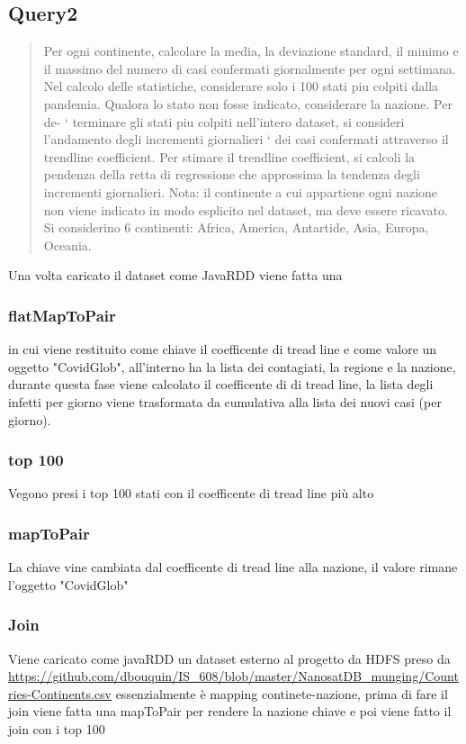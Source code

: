 \documentclass[acmsmall]{acmart}
\begin{document}
\subsection{Query2}
\begin{quote}
Per ogni continente, calcolare la media, la deviazione standard, il minimo e il massimo del numero di
casi confermati giornalmente per ogni settimana. Nel calcolo delle statistiche, considerare solo i 100
stati piu colpiti dalla pandemia. Qualora lo stato non fosse indicato, considerare la nazione. Per de- `
terminare gli stati piu colpiti nell’intero dataset, si consideri l’andamento degli incrementi giornalieri `
dei casi confermati attraverso il trendline coefficient. Per stimare il trendline coefficient, si calcoli la
pendenza della retta di regressione che approssima la tendenza degli incrementi giornalieri.
Nota: il continente a cui appartiene ogni nazione non viene indicato in modo esplicito nel dataset, ma
deve essere ricavato. Si considerino 6 continenti: Africa, America, Antartide, Asia, Europa, Oceania.\end{quote}

Una volta caricato il dataset come JavaRDD viene fatta una 
\subsubsection{flatMapToPair}
in cui viene restituito come chiave il coefficente di tread line e come valore un oggetto
"CovidGlob", all'interno ha la lista dei contagiati, la regione e la nazione, durante questa fase viene calcolato il coefficente di di tread line, la lista degli infetti per giorno viene trasformata da cumulativa alla lista dei nuovi casi (per giorno).
\subsubsection{top 100}
Vegono presi i top 100 stati con il coefficente di tread line più alto

\subsubsection{mapToPair}
La chiave vine cambiata dal coefficente di tread line alla nazione, il valore rimane l'oggetto  "CovidGlob"

\subsubsection{Join}
Viene caricato come javaRDD un dataset esterno al progetto da HDFS preso da \\ \url{https://github.com/dbouquin/IS_608/blob/master/NanosatDB_munging/Countries-Continents.csv}   
essenzialmente è mapping continete-nazione, prima di fare il join viene fatta una mapToPair per rendere la nazione chiave e poi viene fatto il join con i top 100
\end{document}
